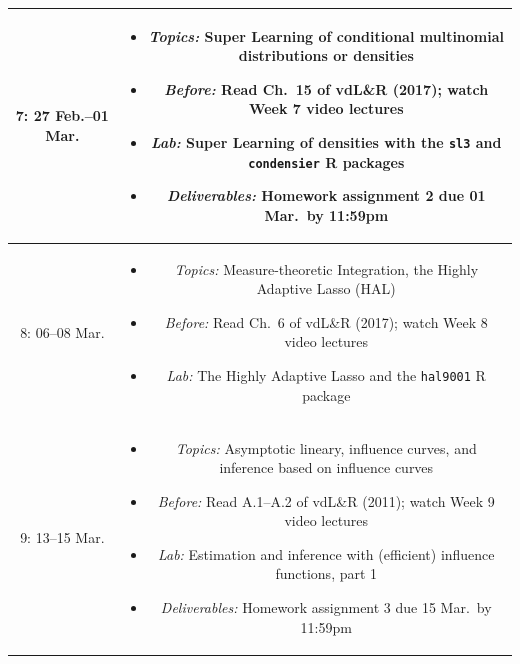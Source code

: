 \documentclass[11pt]{article}
\begin{document}
\begin{table}[H]
\begin{tabular}{ | c | c | }
7: 27 Feb.--01 Mar. & \begin{minipage}{.85\textwidth}
\begin{itemize} \itemsep-0.4em
  \vspace{1mm}
  \item \textit{Topics:} Super Learning of conditional multinomial distributions
    or densities
  \item \textit{Before:} Read Ch.~15 of vdL\&R (2017); watch Week 7 video
    lectures
  \item \textit{Lab:} Super Learning of densities with the \texttt{sl3} and
    \texttt{condensier} R packages
  \item \textit{Deliverables:} Homework assignment 2 due 01 Mar.~by 11:59pm
  \vspace{1mm}
\end{itemize}
\end{minipage} \\
\hline

8: 06--08 Mar. & \begin{minipage}{.85\textwidth}
\begin{itemize} \itemsep-0.4em
  \vspace{1mm}
  \item \textit{Topics:} Measure-theoretic Integration, the Highly Adaptive
    Lasso (HAL)
  \item \textit{Before:} Read Ch.~6 of vdL\&R (2017); watch Week 8 video
    lectures
  \item \textit{Lab:} The Highly Adaptive Lasso and the \texttt{hal9001} R
    package
  \vspace{1mm}
\end{itemize}
\end{minipage} \\
\hline

9: 13--15 Mar. & \begin{minipage}{.85\textwidth}
\begin{itemize} \itemsep-0.4em
  \vspace{1mm}
  \item \textit{Topics:} Asymptotic lineary, influence curves, and inference
    based on influence curves
  \item \textit{Before:} Read A.1--A.2 of vdL\&R (2011); watch Week 9 video
    lectures
  \item \textit{Lab:} Estimation and inference with (efficient) influence
    functions, part 1
  \item \textit{Deliverables:} Homework assignment 3 due 15 Mar.~by 11:59pm
  \vspace{1mm}
\end{itemize}
\end{minipage} \\
\hline

\end{tabular} 
\end{table}
\end{document}
